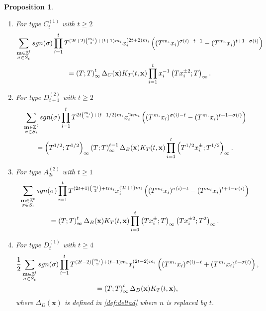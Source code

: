 \documentclass[11pt,letterpaper]{amsart}
\def\bbbz{\mathbb Z}
\def\sgn{{\rm sgn}}
\newtheorem{prop}[df]{Proposition}		%
\numberwithin{equation}{section}
\numberwithin{df}{section}
\begin{document}
\begin{prop}
\begin{enumerate}
\begin{multline*}
\left((T^{m_i}x_i)^{\sigma(i)-t-1}-(T^{m_i}x_i)^{t+1-\sigma(i)}\right)\\
=\left(T^2;T^2\right)_\infty\left(T;T\right)_\infty^{t-1}\Delta_C(\mathbf{x}) K_T(t,\mathbf{x})\prod_{i=1}^t x_i^{-1}\left(T^2x_i^{\pm 2};T^2\right)_\infty,
\end{multline*}
where $\Delta_C(\mathbf{x})$ is defined in \eqref{def:deltac} where $n$ is replaced by $t$.
\item For type $C^{(1)}_{t}$ with $t\geq 2$
\begin{multline}\label{eq:macdostart}
\sum_{\substack{\mathbf{m}\in\bbbz^t\\\sigma\in S_t}}\sgn(\sigma)\prod_{i=1}^tT^{(2t+2)\binom{m_i}{2}+(t+1)m_i}x_i^{(2t+2)m_i}
\left((T^{m_i}x_i)^{\sigma(i)-t-1}-(T^{m_i}x_i)^{t+1-\sigma(i)}\right)\\
=\left(T;T\right)_\infty^{t}\Delta_C(\mathbf{x}) K_T(t,\mathbf{x})\prod_{i=1}^t x_i^{-1}\left(Tx_i^{\pm 2};T\right)_\infty.
\end{multline}

\item For type $D^{(2)}_{t+1}$ with $t\geq 2$
\begin{multline*}
\sum_{\substack{\mathbf{m}\in\bbbz^t\\\sigma\in S_t}}\sgn(\sigma)\prod_{i=1}^tT^{2t\binom{m_i}{2}+(t-1/2)m_i}x_i^{2tm_i}\left((T^{m_i}x_i)^{\sigma(i)-t}-(T^{m_i}x_i)^{t+1-\sigma(i)}\right)\\=
\left(T^{1/2};T^{1/2}\right)_\infty\left(T;T\right)_\infty^{t-1}\Delta_B(\mathbf{x}) K_T(t,\mathbf{x})\prod_{i=1}^t \left(T^{1/2}x_i^{\pm};T^{1/2}\right)_\infty.
\end{multline*}

\item For type $A^{(2)}_{2t}$ with $t\geq 1$
\begin{multline}\label{eq:macdoBCstart}
\sum_{\substack{\mathbf{m}\in\bbbz^t\\\sigma\in S_t}}\sgn(\sigma)\prod_{i=1}^tT^{(2t+1)\binom{m_i}{2}+tm_i}x_i^{(2t+1)m_i}
\left((T^{m_i}x_i)^{\sigma(i)-t}-(T^{m_i}x_i)^{t+1-\sigma(i)}\right)\\=\left(T;T\right)_\infty^{t}\Delta_B(\mathbf{x}) K_T(t,\mathbf{x})\prod_{i=1}^t\left(Tx_i^{\pm};T\right)_\infty\left(Tx_i^{\pm 2};T^2\right)_\infty.
\end{multline}

\item For type $D^{(1)}_{t}$ with $t\geq 4$
\begin{multline*}
\frac{1}{2}\sum_{\substack{\mathbf{m}\in\bbbz^t\\\sigma\in S_t}}\sgn(\sigma)\prod_{i=1}^tT^{(2t-2)\binom{m_i}{2}+(t-1)m_i}x_i^{(2t-2)m_i}
\left((T^{m_i}x_i)^{\sigma(i)-t}+(T^{m_i}x_i)^{t-\sigma(i)}\right),
\\=\left(T;T\right)_\infty^{t}\Delta_D(\mathbf{x}) K_T(t,\mathbf{x}),
\end{multline*}
where $\Delta_D(\mathbf{x})$ is defined in \eqref{def:deltad} where $n$ is replaced by $t$.

\end{enumerate}

\end{prop}
\end{document}
